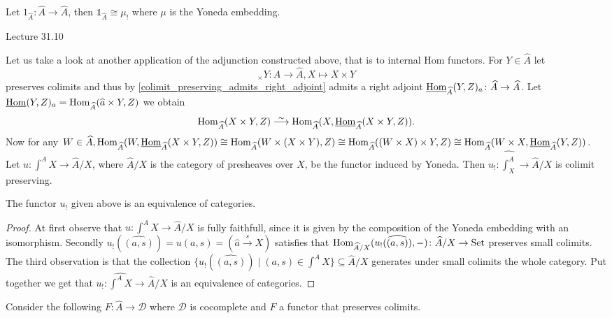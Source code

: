 \begin{exmp}
    Let $1_{\widehat{A}}\colon \widehat{A} \to \widehat{A}$, then $\mathds{1}_{\widehat{A}} \cong \mu_!$
    where $\mu$ is the Yoneda embedding.
\end{exmp}

Lecture 31.10

Let us take a look at another application of the adjunction constructed above, that is to internal Hom functors.
For $Y \in \widehat{A}$ let
\[
_ \times Y \colon \widehat{A} \to \widehat{A}, X \mapsto X \times Y
\]
preserves colimits and thus by \cref{colimit_preserving_admits_right_adjoint} admits a right adjoint $\underline{\operatorname{Hom}}_{\widehat{A}}(Y,Z)_a\colon \widehat{A} \to \widehat{A}$.
Let $\underline{\operatorname{Hom}}(Y,Z)_a =\operatorname{Hom}_{\widehat{A}}(\widehat{a} \times Y, Z)$ we obtain
\[
\Hom_{\widehat{A}}(X \times Y, Z) \isomorphism \Hom_{\widehat{A}}(X, \underline{\Hom}_{\widehat{A}}(X \times Y,Z)).
\]
Now for any $W \in \widehat{A}, \operatorname{Hom}_{\widehat{A}}(W, \underline{\operatorname{Hom}}_{\widehat{A}}(X \times Y, Z)) \cong \operatorname{Hom}_{\widehat{A}}(W \times(X \times Y),Z) \cong \operatorname{Hom}_{\widehat{A}}((W \times X) \times Y,Z) \cong \operatorname{Hom}_{\widehat{A}}(W \times X, \underline{\operatorname{Hom}}_{\widehat{A}}(Y,Z))$.
Let $u \colon \int^AX \to \widehat{A}/X$, where $\widehat{A}/X$ is the category of presheaves over $X$, be the functor induced by Yoneda.
Then $u_! \colon \widehat{\int^A_X} \to \widehat{A} /X$ is colimit preserving.

\begin{thm}
    The functor $u_!$ given above is an equivalence of categories.
\end{thm}

\begin{proof}
    At first observe that $u \colon \int^AX \to \widehat{A}/X$ is fully faithfull, since it is given by the composition of the Yoneda embedding with an isomorphism.
    Secondly $u_!(\widehat{(a,s)})=u(a,s)=(\widehat{a} \xrightarrow{s}X)$ satisfies that $\operatorname{Hom}_{\widehat{A}/X}(u_! ( \widehat{(a,s)}), - ) \colon \widehat{A}/X \to \operatorname{Set}$ preserves small colimits.
    The third observation is that the collection $\{ u_!(\widehat{(a,s)}) \mid (a,s) \in \int^A X \} \subseteq \widehat{A}/X$ generates under small colimits the whole category.
    Put together we get that $u_!\colon \widehat{\int^A X} \to \widehat{A}/X$ is an equivalence of categories.
\end{proof}

Consider the following $F\colon \widehat{A} \to \mathcal{D}$ where $\mathcal{D}$ is cocomplete and $F$ a functor that preserves colimits.

